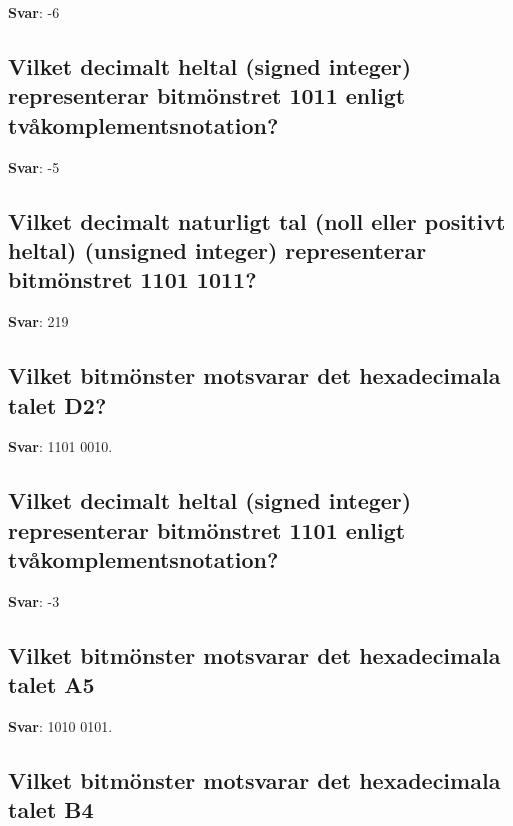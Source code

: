 \documentclass[a4paper,11pt,oneside]{article}
\begin{document}
\begin{sloppypar}
\label{q:377:sa:sv:True}

\textbf{Svar}: -6



\subsection{Vilket decimalt heltal (signed integer) representerar bitm\"onstret 1011 enligt tv\r{a}komplementsnotation?}

\label{q:378:sa:sv:True}

\textbf{Svar}: -5



\subsection{Vilket decimalt naturligt tal (noll eller positivt heltal) (unsigned integer) representerar bitm\"onstret 1101 1011?}

\label{q:379:sa:sv:True}

\textbf{Svar}: 219



\subsection{Vilket bitm\"onster motsvarar det hexadecimala talet D2?}

\label{q:380:sa:sv:True}

\textbf{Svar}: 1101 0010.



\subsection{Vilket decimalt heltal (signed integer) representerar bitm\"onstret 1101 enligt tv\r{a}komplementsnotation?}

\label{q:381:sa:sv:True}

\textbf{Svar}: -3



\subsection{Vilket bitm\"onster motsvarar det hexadecimala talet A5}

\label{q:382:sa:sv:True}

\textbf{Svar}: 1010 0101.



\subsection{Vilket bitm\"onster motsvarar det hexadecimala talet B4}


\end{sloppypar}
\end{document}

